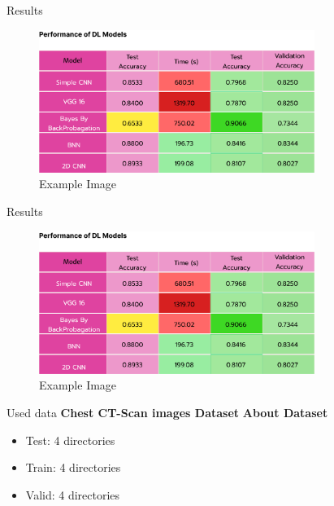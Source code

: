 \documentclass[aspectratio=169,xcolor=dvipsnames, t]{beamer}
\begin{document}
\begin{frame}{Results}
   \begin{figure}[h]
    \centering
    \includegraphics[width=0.8\textwidth]{images/table1.png}
    \caption{Example Image}
    \label{fig:example}
\end{figure}

\end{frame}

\begin{frame}{Results}
   \begin{figure}[h]
    \centering
    \includegraphics[width=0.8\textwidth]{images/table1.png}
    \caption{Example Image}
    \label{fig:example}
\end{figure}

\end{frame}


\begin{frame}{Used data}
\textbf{Chest CT-Scan images Dataset}
  \textbf{About Dataset} \\
    \begin{itemize}
        \item Test: 4 directories
        \item Train: 4 directories
        \item Valid: 4 directories
    \end{itemize}
    \vspace{0.5em}
\end{frame}
\end{document}
